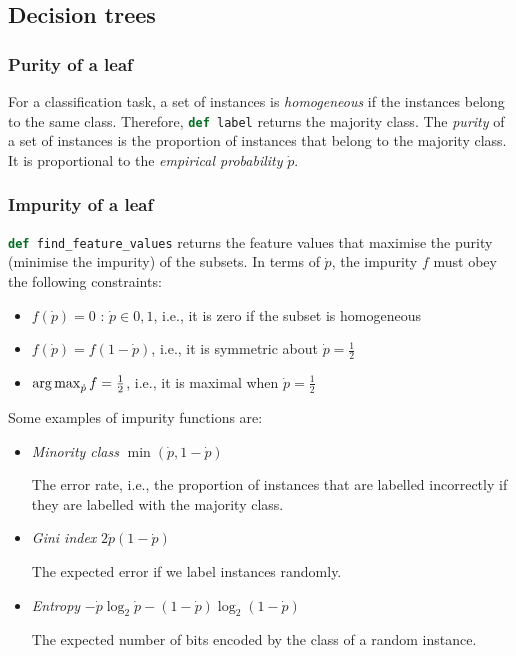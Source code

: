 \subsection{Decision trees}

\subsubsection{Purity of a leaf}

For a classification task, a set of instances is \textit{homogeneous} if the instances belong to the same class.
Therefore, \lstinline[language=Python]{def label} returns the majority class.
The \textit{purity} of a set of instances is the proportion of instances that belong to the majority class.
It is proportional to the \textit{empirical probability} $\dot{p}$.

\subsubsection{Impurity of a leaf}

\lstinline[language=Python]{def find_feature_values} returns the feature values that maximise the purity (minimise the impurity) of the subsets.
In terms of $\dot{p}$, the impurity $f$ must obey the following constraints:

\begin{itemize}
  \item $f(\dot{p}) = 0$ : $\dot{p} \in {0, 1}$, i.e., it is zero if the subset is homogeneous
  \item $f(\dot{p}) = f(1 - \dot{p})$, i.e., it is symmetric about $\dot{p} = \frac{1}{2}$
  \item $\operatorname*{arg\,max}_{\dot{p}} f = \frac{1}{2}$, i.e., it is maximal when $\dot{p} = \frac{1}{2}$
\end{itemize}
Some examples of impurity functions are:

\begin{itemize}
  \item \textit{Minority class} $\min(\dot{p}, 1 - \dot{p})$

        The error rate, i.e., the proportion of instances that are labelled incorrectly if they are labelled with the majority class.

  \item \textit{Gini index} $2 \dot{p} (1 - \dot{p})$

        The expected error if we label instances randomly.

  \item \textit{Entropy} $- \dot{p} \log_2 \dot{p} - (1 - \dot{p}) \log_2 (1 - \dot{p})$

        The expected number of bits encoded by the class of a random instance.

\end{itemize}

